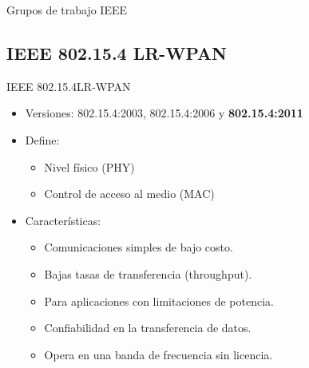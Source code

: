\documentclass[aspectratio=169, handout]{beamer}
\begin{document}
\begin{frame}{Grupos de trabajo IEEE}
\end{frame}

\subsection[IEEE 802.15.4]{IEEE 802.15.4 LR-WPAN}

\begin{frame}{IEEE 802.15.4}{LR-WPAN}
	\begin{itemize}
		\item Versiones: 802.15.4:2003, 802.15.4:2006 y \textbf{802.15.4:2011}
		\vspace{5px}
		\item Define:
		\begin{itemize}
			\item Nivel físico (PHY)
			\item Control de acceso al medio (MAC)
		\end{itemize}
		\vspace{5px}
		\item Características:
		\begin{itemize}
			\item Comunicaciones simples de bajo costo. 
			\item Bajas tasas de transferencia (throughput).
			\item Para aplicaciones con limitaciones de potencia.
			\item Confiabilidad en la transferencia de datos.
			\item Opera en una banda de frecuencia sin licencia.
		\end{itemize}
	\end{itemize}
	
\end{frame}
\end{document}
